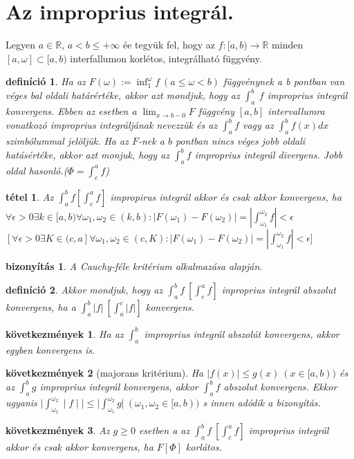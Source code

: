 \documentclass{article}
\newcommand{\R}{\mathbb{R}}
\newcommand{\n}{\rightarrow}
\newcommand{\di}{\displaystyle}
\theoremstyle{magyar}
\newtheorem{de}{definíció}[section]
\newtheorem{te}{tétel}[section]
\newtheorem{bi}{bizonyítás}[section]
\newtheorem{ko}{következmények}[section]
\begin{document}
\section{Az improprius integrál.}
Legyen $a\in\R$, $a<b\le+\infty$ ée tegyük fel, hogy az $f:[a,b)\rightarrow\R$
minden $[a,\omega]\subset[a,b)$ interfallumon korlétos, integrálható függvény. 
\begin{de}
  Ha az $F(\omega):=\di\inf_1^\omega f\ (a\le\omega <b)$ függvénynek a b 
  pontban van véges bal oldali határértéke, akkor azt mondjuk, hogy az 
  $\di\int_a^b\ f$ improprius integrál konvergens. Ebben az esetben a 
  $\di\lim_{x\n b-0} F$ függvény $[a,b]$ intervallumra vonatkozó improprius 
  integráljának nevezzük és az $\di\int_a^bf$ vagy az $\di\int_a^b f(x)dx$ 
  szimbólummal jelöljük. Ha az $F$-nek a $b$ pontban nincs véges jobb oldali 
  hatásértéke, akkor azt monjuk, hogy az $\di\int_a^bf$ improprius integrál 
  divergens. Jobb oldal hasonló.($\Phi=\di\int_c^af$)
\end{de}
\begin{te}
  Az $\di\int_a^bf [\int_c^af]$ impropirus integrál akkor és csak akkor 
  konvergens, ha\\
  $\di\forall\epsilon>0 \exists k\in[a,b) \forall\omega_1,\omega_2\in(k,b): 
  |F(\omega_1)-F(\omega_2)|=|\int_{\omega_1}^{\omega_2}f|<\epsilon$
  $[\di\forall\epsilon>0 \exists K\in(c,a] \forall\omega_1,\omega_2\in(c,K): 
  |F(\omega_1)-F(\omega_2)|=|\int_{\omega_1}^{\omega_2}f|<\epsilon]$
\end{te}
\begin{bi}
  A Cauchy-féle kritérium alkalmazása alapján.
\end{bi}
\begin{de}
  Akkor mondjuk, hogy az $\di\int_a^bf\ [\int_c^af]$ inproprius integrál
  abszolut konvergens, ha a $\di\int_a^b|f|\ [\int_a^c|f|]$ konvergens.
\end{de}
\begin{ko}
  Ha az $\di\int_a^b$ improprius integrál abszolút konvergens, akkor egyben 
  konvergens is.
\end{ko}
\begin{ko}[majorans kritérium]
  Ha $|f(x)|\le g(x)\ (x\in[a,b))$ és az $\di\int_a^bg$ improprius integrál 
  konvergens, akkor $\di\int_a^bf$ abszolut konvergens. Ekkor ugyanis $\di\mid
  \int_{\omega_1}^{\omega_2}\textstyle\mid f\mid\mid\le\mid\int_{\omega_1}^
  {\omega_2}g|\ (\omega_1,\omega_2\in[a,b))$ s innen adódik a bizonyítás.
\end{ko}
\begin{ko}
  Az $g\ge0$ esetben a az $\di\int_a^bf\ [\int_c^af]$ improprius integrál akkor
  és csak akkor konvergens, ha $F[\Phi]$ korlátos.
\end{ko}
\end{document}
